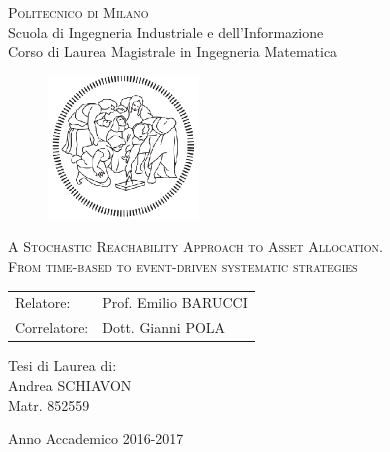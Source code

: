 \begin{titlepage}

	\begin{center}
		\normalsize 
			\textsc{Politecnico di Milano}\\
			Scuola di Ingegneria Industriale e dell'Informazione\\
      		Corso di Laurea Magistrale in Ingegneria Matematica\\
	\end{center}
	\vspace{.6cm}
	
	\begin{figure}[htpb]
		\centering
		\includegraphics[width=4cm]{Cover/polimi}
	\end{figure}
	\vspace{.6cm}
	
	\begin{center}
		\LARGE
			\textsc{A Stochastic Reachability Approach to Asset Allocation.\\}
		\Large
		    \textsc{From time-based to event-driven systematic strategies}
	\end{center}
	\vspace{1.6cm}

	\begin{flushleft}
		\large
		\begin{tabular}{ll}
		Relatore:    & Prof. Emilio BARUCCI      \\
		Correlatore: & Dott. Gianni POLA
		\end{tabular}
		\vspace{1cm}
	\end{flushleft}
	
	\begin{flushright}
		\large
		Tesi di Laurea di:\\
		Andrea SCHIAVON\\
		Matr. 852559\\		
	\end{flushright}
	
	\vspace*{\fill}
	\begin{center}
		Anno Accademico 2016-2017
	\end{center}
	
\end{titlepage}
